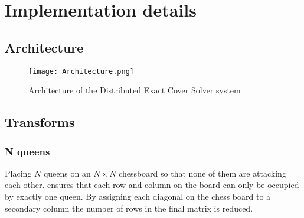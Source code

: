 
\chapter{Implementation details}
\label{implementation}


\section{Architecture}


\begin{figure}[htb]
	\centering 
	\texttt{[image: Architecture.png]}
	\caption{Architecture of the Distributed Exact Cover Solver system}
	\label{fig:architecture}
\end{figure}



\section{Transforms}


\subsection{N queens}
\label{queens_trans}


Placing $N$ queens on an $N \times N$ chessboard so that none of them are attacking each other. ensures that each row and column on the board can only be occupied by exactly one queen.
By assigning each diagonal on the chess board to a secondary column the number of rows in the final matrix is reduced.






